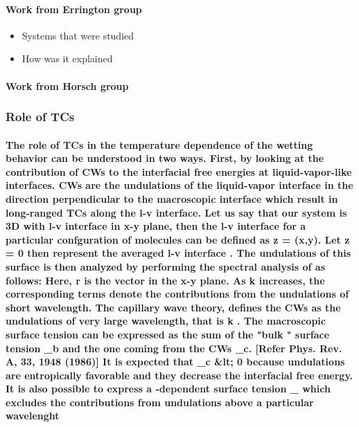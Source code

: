 \documentclass[a4paper,12pt,single,pdftex]{scrartcl}
\begin{document}
\label{ID_1690050024}\paragraph{Work from Errington group}

\begin{itemize}
\label{ID_473109498}\item Systems that were studied
\label{ID_1487682070}\item How was it explained
\end{itemize}
\label{ID_473109498}\label{ID_1487682070}\label{ID_980454220}\paragraph{Work from Horsch group}

\label{ID_1942058277}\subsubsection{Role of TCs}

\label{ID_896680657}\paragraph{The role of TCs in the temperature dependence of the wetting behavior can be understood in two ways. First, by looking at the contribution of CWs to the interfacial free energies at liquid-vapor-like interfaces. CWs are the undulations of the liquid-vapor interface in the direction perpendicular to the macroscopic interface which result in long-ranged TCs along the l-v interface. Let us say that our system is 3D with l-v interface in x-y plane, then the l-v interface for a particular confguration of molecules can be defined as z = \xi (x,y). Let z = 0 then represent the averaged l-v interface . The undulations of this surface is then analyzed by performing the spectral analysis of \xi as follows: Here, r is the vector  in the x-y plane. As k increases, the corresponding terms denote the contributions from the undulations of short wavelength. The capillary wave theory, defines the CWs as the undulations of very large wavelength, that is k . The macroscopic surface tension  \sigma can be expressed as the sum of the "bulk " surface tension  \sigma_b and the one coming from the CWs \sigma_c. [Refer Phys. Rev. A, 33, 1948 (1986)] It is expected that \sigma_c &lt; 0 because undulations are entropically favorable and they decrease the interfacial free energy.  It is also possible to express a \lambda-dependent surface tension \sigma_{\lambda} which excludes the contributions from undulations above a particular wavelenght \lambda}
\end{document}
